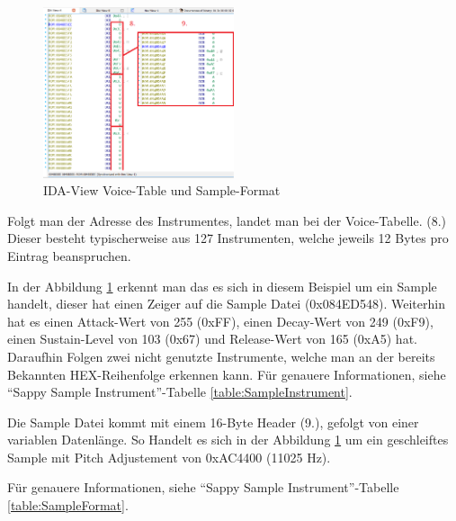 \documentclass[11pt,a4paper]{scrartcl}
\begin{document}
\begin{figure}
	\vspace{-10pt}
	\begin{center}
		\includegraphics[width=0.5\textwidth]{Sampleformat}
	\end{center}
	\vspace{-10pt}
	\caption{IDA-View Voice-Table und Sample-Format}
	\label{fig:Sampleformat}
	\vspace{-30pt}
\end{figure}

Folgt man der Adresse des Instrumentes, landet man bei der Voice-Tabelle. (8.) Dieser besteht typischerweise aus 127 Instrumenten, welche jeweils 12 Bytes pro Eintrag beanspruchen.

In der Abbildung \ref{fig:Sampleformat} erkennt man das es sich in diesem Beispiel um ein Sample handelt, dieser hat einen Zeiger auf die Sample Datei (0x084ED548). Weiterhin hat es einen Attack-Wert von 255 (0xFF), einen Decay-Wert von 249 (0xF9), einen Sustain-Level von 103 (0x67) und Release-Wert von 165 (0xA5) hat. Daraufhin Folgen zwei nicht genutzte Instrumente, welche man an der bereits Bekannten HEX-Reihenfolge erkennen kann.
F\"ur genauere Informationen, siehe "`Sappy Sample Instrument"'-Tabelle \ref{table:SampleInstrument}.

Die Sample Datei kommt mit einem 16-Byte Header (9.), gefolgt von einer variablen Datenl\"ange. So Handelt es sich in der Abbildung \ref{fig:Sampleformat} um ein geschleiftes Sample mit Pitch Adjustement
von 0xAC4400 (11025 Hz).

F\"ur genauere Informationen, siehe "`Sappy Sample Instrument"'-Tabelle \ref{table:SampleFormat}.
\end{document}
